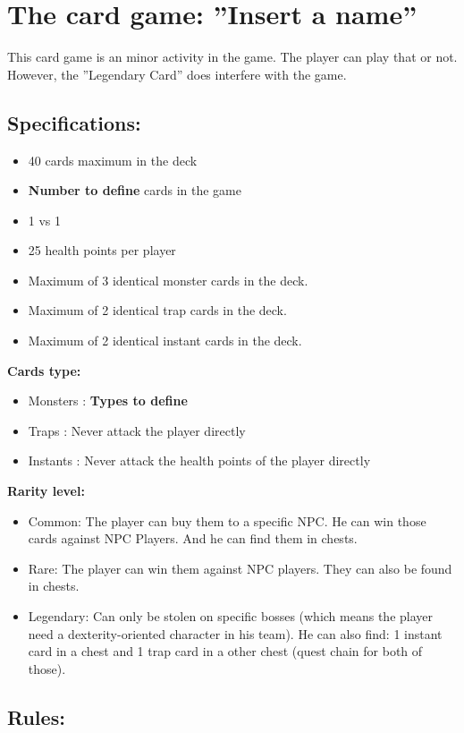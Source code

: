 \documentclass[a4paper,12pt]{book}
\begin{document}
\chapter{The card game: ''Insert a name''}
This card game is an minor activity in the game. The player can play that or not. However, the ''Legendary Card'' does interfere with the game.
\section{Specifications:}
\begin{itemize}
	\item 40 cards maximum in the deck
	\item \textbf{Number to define} cards in the game
	\item 1 vs 1
	\item 25 health points per player
	\item Maximum of 3 identical monster cards in the deck.
	\item Maximum of 2 identical trap cards in the deck.
	\item Maximum of 2 identical instant cards in the deck.
\end{itemize}
\textbf{Cards type:}
\begin{itemize}
	\item Monsters : \textbf{Types to define}
	\item Traps : Never attack the player directly
	\item Instants : Never attack the health points of the player directly
\end{itemize}
\textbf{Rarity level:}
\begin{itemize}
	\item Common: The player can buy them to a specific NPC. He can win those cards against NPC Players. And he can find them in chests.
	\item Rare: The player can win them against NPC players. They can also be found in chests.
	\item Legendary: Can only be stolen on specific bosses (which means the player need a dexterity-oriented character in his team). He can also find: 1 instant card in a chest and 1 trap card in a other chest (quest chain for both of those).
\end{itemize}

\section{Rules:}
\end{document}

